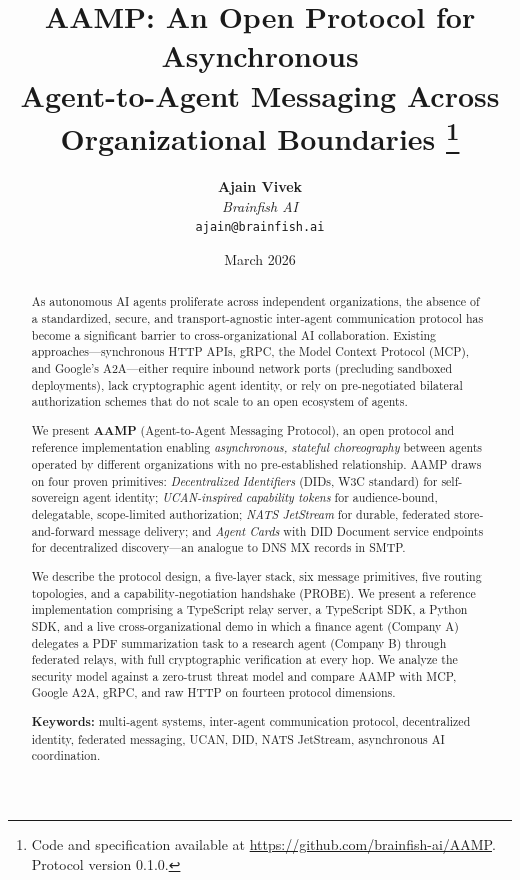 \documentclass[11pt,a4paper]{article}
\title{%
  \textbf{AAMP: An Open Protocol for Asynchronous\\
  Agent-to-Agent Messaging Across Organizational Boundaries}%
  \thanks{Code and specification available at
    \url{https://github.com/brainfish-ai/AAMP}.
    Protocol version 0.1.0.
  }
}
\author{%
  \textbf{Ajain Vivek}\\[4pt]
  \textit{Brainfish AI}\\[2pt]
  \texttt{ajain@brainfish.ai}
}
\date{March 2026}
\begin{document}
\maketitle

\begin{abstract}
As autonomous AI agents proliferate across independent organizations, the absence of a
standardized, secure, and transport-agnostic inter-agent communication protocol has
become a significant barrier to cross-organizational AI collaboration.
Existing approaches---synchronous HTTP APIs, gRPC, the Model Context Protocol (MCP),
and Google's A2A---either require inbound network ports (precluding sandboxed deployments),
lack cryptographic agent identity, or rely on pre-negotiated bilateral authorization
schemes that do not scale to an open ecosystem of agents.

We present \textbf{AAMP} (Agent-to-Agent Messaging Protocol), an open protocol and
reference implementation enabling \emph{asynchronous, stateful choreography} between
agents operated by different organizations with no pre-established relationship.
AAMP draws on four proven primitives: \emph{Decentralized Identifiers} (DIDs, W3C standard)
for self-sovereign agent identity; \emph{UCAN-inspired capability tokens} for
audience-bound, delegatable, scope-limited authorization; \emph{NATS JetStream} for
durable, federated store-and-forward message delivery; and \emph{Agent Cards} with DID
Document service endpoints for decentralized discovery---an analogue to DNS MX records
in SMTP.

We describe the protocol design, a five-layer stack, six message primitives, five
routing topologies, and a capability-negotiation handshake (PROBE). We present a
reference implementation comprising a TypeScript relay server, a TypeScript SDK, a
Python SDK, and a live cross-organizational demo in which a finance agent (Company A)
delegates a PDF summarization task to a research agent (Company B) through federated
relays, with full cryptographic verification at every hop. We analyze the security model
against a zero-trust threat model and compare AAMP with MCP, Google A2A, gRPC, and raw
HTTP on fourteen protocol dimensions.

\textbf{Keywords:} multi-agent systems, inter-agent communication protocol, decentralized
identity, federated messaging, UCAN, DID, NATS JetStream, asynchronous AI coordination.
\end{abstract}
\end{document}
